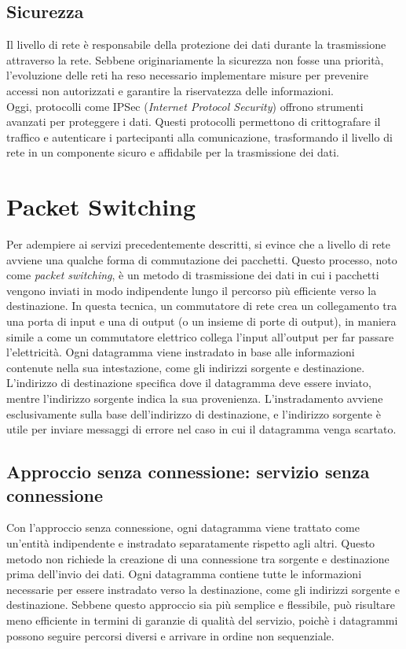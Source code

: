 \documentclass[12pt]{report}
\begin{document}
	\subsection{Sicurezza}
	Il livello di rete è responsabile della protezione dei dati durante la trasmissione attraverso la rete. Sebbene originariamente la sicurezza non fosse una priorità, l'evoluzione delle reti ha reso necessario implementare misure per prevenire accessi non autorizzati e garantire la riservatezza delle informazioni.
	\vspace{\baselineskip}\\
	Oggi, protocolli come IPSec (\textit{Internet Protocol Security}) offrono strumenti avanzati per proteggere i dati. Questi protocolli permettono di crittografare il traffico e autenticare i partecipanti alla comunicazione, trasformando il livello di rete in un componente sicuro e affidabile per la trasmissione dei dati.
	
	\section{Packet Switching}
	Per adempiere ai servizi precedentemente descritti, si evince che a livello di rete avviene una qualche forma di commutazione dei pacchetti. Questo processo, noto come \textit{packet switching}, è un metodo di trasmissione dei dati in cui i pacchetti vengono inviati in modo indipendente lungo il percorso più efficiente verso la destinazione. In questa tecnica, un commutatore di rete crea un collegamento tra una porta di input e una di output (o un insieme di porte di output), in maniera simile a come un commutatore elettrico collega l'input all'output per far passare l'elettricità. Ogni datagramma viene instradato in base alle informazioni contenute nella sua intestazione, come gli indirizzi sorgente e destinazione. L'indirizzo di destinazione specifica dove il datagramma deve essere inviato, mentre l'indirizzo sorgente indica la sua provenienza. L'instradamento avviene esclusivamente sulla base dell'indirizzo di destinazione, e l'indirizzo sorgente è utile per inviare messaggi di errore nel caso in cui il datagramma venga scartato.
	
	\subsection{Approccio senza connessione: servizio senza connessione}
	Con l'approccio senza connessione, ogni datagramma viene trattato come un'entità indipendente e instradato separatamente rispetto agli altri. Questo metodo non richiede la creazione di una connessione tra sorgente e destinazione prima dell'invio dei dati. Ogni datagramma contiene tutte le informazioni necessarie per essere instradato verso la destinazione, come gli indirizzi sorgente e destinazione. Sebbene questo approccio sia più semplice e flessibile, può risultare meno efficiente in termini di garanzie di qualità del servizio, poichè i datagrammi possono seguire percorsi diversi e arrivare in ordine non sequenziale.
	
\end{document}
